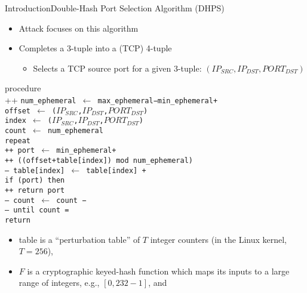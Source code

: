 \documentclass[a4paper]{article}
\begin{document}
\begin{frame}[fragile]{Introduction}{Double-Hash Port Selection Algorithm (DHPS)}
	\begin{itemize}
		\item Attack focuses on this algorithm
		\item Completes a 3-tuple into a (TCP) 4-tuple
		\begin{itemize}
			\item Selects a TCP source port for a given 3-tuple: $(IP_{SRC},IP_{DST},PORT_{DST})$
		\end{itemize}
	\end{itemize}
	\begin{algorithm}{}{\thetcbcounter}
		\begin{pseudo}[indent-mark,kw,hl-warn=false]
			procedure  \\++
			\tt{num\_ephemeral} $\leftarrow$ \tt{max\_ephemeral}−\tt{min\_ephemeral}+ \\
			\tt{offset} $\leftarrow$ ($IP_{SRC}$,$IP_{DST}$,$PORT_{DST}$) \\
			\tt{index} $\leftarrow$ ($IP_{SRC}$,$IP_{DST}$,$PORT_{DST}$) \\
			\tt{count} $\leftarrow$ \tt{num\_ephemeral} \\
			repeat \\++
			\tt{port} $\leftarrow$ \tt{min\_ephemeral}+\\++
			((\tt{offset}+\tt{table[index]}) mod \tt{num\_ephemeral}) \\--
			\tt{table[index]} $\leftarrow$ \tt{table[index]} + \\
			if (\tt{port}) then \\++
			return \tt{port} \\--
			\tt{count} $\leftarrow$ \tt{count} −  \\--
			until \tt{count} =  \\
			return  \\
		\end{pseudo}
	\end{algorithm}
	\begin{itemize}
		\item table is a \enquote{perturbation table} of $T$ integer counters (in the Linux kernel, $T = 256$),
		\item $F$ is a cryptographic keyed-hash function which maps its inputs to a large range of integers, e.g., $[0,232-1]$, and

\end{itemize}
\end{frame}
\end{document}
